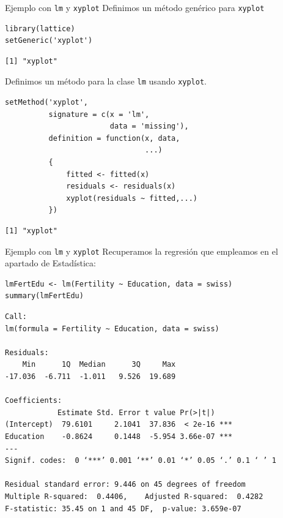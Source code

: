 \documentclass[xcolor={usenames,svgnames,dvipsnames}]{beamer}
\begin{document}
\begin{frame}[fragile,label={sec:orgheadline38}]{Ejemplo con \texttt{lm} y \texttt{xyplot}}
 Definimos un método genérico para \texttt{xyplot}
\lstset{language=R,label= ,caption= ,captionpos=b,numbers=none}
\begin{lstlisting}
library(lattice)
setGeneric('xyplot')
\end{lstlisting}

\begin{verbatim}
[1] "xyplot"
\end{verbatim}

Definimos un método para la clase \texttt{lm} usando \texttt{xyplot}.
\lstset{language=R,label= ,caption= ,captionpos=b,numbers=none}
\begin{lstlisting}
setMethod('xyplot',
          signature = c(x = 'lm',
                        data = 'missing'),
          definition = function(x, data,
                                ...)
          {
              fitted <- fitted(x)
              residuals <- residuals(x)
              xyplot(residuals ~ fitted,...)
          })
\end{lstlisting}

\begin{verbatim}
[1] "xyplot"
\end{verbatim}
\end{frame}

\begin{frame}[fragile,label={sec:orgheadline39}]{Ejemplo con \texttt{lm} y \texttt{xyplot}}
 Recuperamos la regresión que empleamos en el apartado de Estadística:
\lstset{language=R,label= ,caption= ,captionpos=b,numbers=none}
\begin{lstlisting}
lmFertEdu <- lm(Fertility ~ Education, data = swiss)
summary(lmFertEdu)
\end{lstlisting}

\begin{verbatim}
Call:
lm(formula = Fertility ~ Education, data = swiss)

Residuals:
    Min      1Q  Median      3Q     Max 
-17.036  -6.711  -1.011   9.526  19.689 

Coefficients:
            Estimate Std. Error t value Pr(>|t|)    
(Intercept)  79.6101     2.1041  37.836  < 2e-16 ***
Education    -0.8624     0.1448  -5.954 3.66e-07 ***
---
Signif. codes:  0 ‘***’ 0.001 ‘**’ 0.01 ‘*’ 0.05 ‘.’ 0.1 ‘ ’ 1

Residual standard error: 9.446 on 45 degrees of freedom
Multiple R-squared:  0.4406,	Adjusted R-squared:  0.4282 
F-statistic: 35.45 on 1 and 45 DF,  p-value: 3.659e-07
\end{verbatim}
\end{frame}
\end{document}
